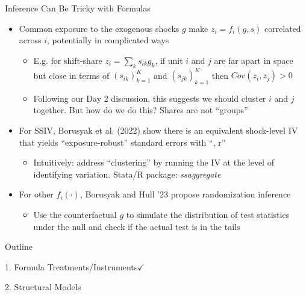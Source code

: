 \documentclass[11pt,english]{beamer}
\begin{document}
\begin{frame}{Inference Can Be Tricky with Formulas}

\begin{itemize}
\item Common exposure to the exogenous shocks $g$ make $z_i=f_i(g,s)$ correlated across $i$, potentially in complicated ways\smallskip
\begin{itemize}
\item E.g. for shift-share $z_i=\sum_k s_{ik}g_k$, if unit $i$ and $j$ are far apart in space but close in terms of $(s_{ik})_{k=1}^K$ and $(s_{jk})_{k=1}^K$ then $Cov(z_i,z_j)>0$ \smallskip\pause{}
\item Following our Day 2 discussion, this suggests we should cluster $i$ and $j$ together.\pause{} But how do we do this? Shares are not ``groups''
\end{itemize}\bigskip\pause{}
\item For SSIV, Borusyak et al. (2022) show there is an equivalent shock-level IV that yields ``exposure-robust'' standard errors with ``, r''\smallskip
\begin{itemize}
\item Intuitively: address ``clustering'' by running the IV at the level of identifying variation. Stata/R package: \emph{ssaggregate}
\end{itemize}\bigskip\pause{}
\item For other $f_i(\cdot)$, Borusyak and Hull '23 propose randomization inference\smallskip
\begin{itemize}
\item Use the counterfactual $g$ to simulate the distribution of test statistics under the null and check if the actual test is in the tails
\end{itemize}
\end{itemize}
\end{frame}


\begin{frame}{Outline}

\textcolor{red!75!green!50!blue!25!gray}{1. Formula Treatments/Instruments}$\checkmark$
\vspace{0.8cm}

2. Structural Models

\end{frame}
\end{document}
